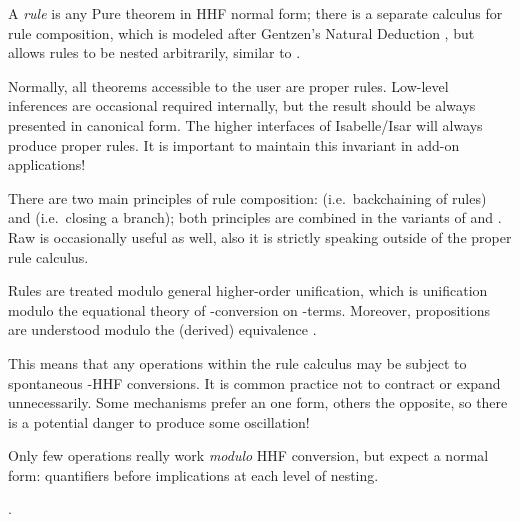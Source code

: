 \begin{isabellebody}
\begin{isamarkuptext}
  A \emph{rule} is any Pure theorem in HHF normal form; there is a
  separate calculus for rule composition, which is modeled after
  Gentzen's Natural Deduction \cite{Gentzen:1935}, but allows
  rules to be nested arbitrarily, similar to \cite{extensions91}.

  Normally, all theorems accessible to the user are proper rules.
  Low-level inferences are occasional required internally, but the
  result should be always presented in canonical form.  The higher
  interfaces of Isabelle/Isar will always produce proper rules.  It is
  important to maintain this invariant in add-on applications!

  There are two main principles of rule composition:  (i.e.\ backchaining of rules) and  (i.e.\ closing a branch); both principles are
  combined in the variants of  and .  Raw  is occasionally
  useful as well, also it is strictly speaking outside of the proper
  rule calculus.

  Rules are treated modulo general higher-order unification, which is
  unification modulo the equational theory of \isa{{\isasymalpha}{\isasymbeta}{\isasymeta}}-conversion
  on \isa{{\isasymlambda}}-terms.  Moreover, propositions are understood modulo
  the (derived) equivalence .

  This means that any operations within the rule calculus may be
  subject to spontaneous \isa{{\isasymalpha}{\isasymbeta}{\isasymeta}}-HHF conversions.  It is common
  practice not to contract or expand unnecessarily.  Some mechanisms
  prefer an one form, others the opposite, so there is a potential
  danger to produce some oscillation!

  Only few operations really work \emph{modulo} HHF conversion, but
  expect a normal form: quantifiers \isa{{\isasymAnd}} before implications
  \isa{{\isasymLongrightarrow}} at each level of nesting.

.


\end{isamarkuptext}
\end{isabellebody}
